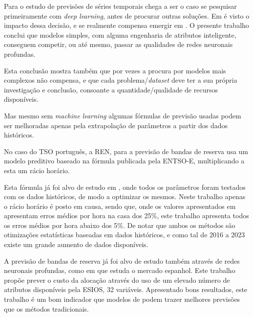 Para o estudo de previsões de séries temporais chega a ser o caso se pesquisar primeiramente com \textit{deep learning}, antes de procurar outras soluções. Em \cite{Elsayed} é visto o impacto dessa decisão, e se realmente compensa emergir em . O presente trabalho conclui que modelos simples, com alguma engenharia de atributos inteligente, conseguem competir, ou até mesmo, passar as qualidades de redes neuronais profundas.\par
Esta conclusão mostra também que por vezes a procura por modelos mais complexos não compensa, e que cada problema/\textit{dataset} deve ter a sua própria investigação e conclusão, consoante a quantidade/qualidade de recursos disponíveis.\par
Mas mesmo sem \textit{machine learning} algumas fórmulas de previsão usadas podem ser melhoradas apenas pela extrapolação de parâmetros a partir dos dados históricos.\par  
No caso do \gls{TSO} português, a \gls{REN}, para a previsão de bandas de reserva usa um modelo preditivo baseado na fórmula publicada pela \gls{ENTSO-E}, multiplicando a esta um rácio horário.\par
Esta fórmula já foi alvo de estudo em \cite{Carneiro2016}, onde todos os parâmetros foram testados com os dados históricos, de modo a optimizar os mesmos. Neste trabalho apenas o rácio horário é posto em causa, sendo que, onde os valores apresentados em \cite{Carneiro2016} apresentam erros médios por hora na casa dos 25\%, este trabalho apresenta todos os erros médios por hora abaixo dos 5\%. De notar que ambos os métodos são otimizações estatísticas baseadas em dados históricos, e como tal de 2016 a 2023 existe um grande aumento de dados disponíveis.\par
A previsão de bandas de reserva já foi alvo de estudo também através de redes neuronais profundas, como em \cite{miota2023} que estuda o mercado espanhol. Este trabalho propõe prever o custo da alocação através do uso de um elevado número de atributos disponíveis pela \gls{ESIOS}, 32 variáveis. Apresentado bons resultados, este trabalho é um bom indicador que modelos de  podem trazer melhores previsões que os métodos tradicionais.\par


